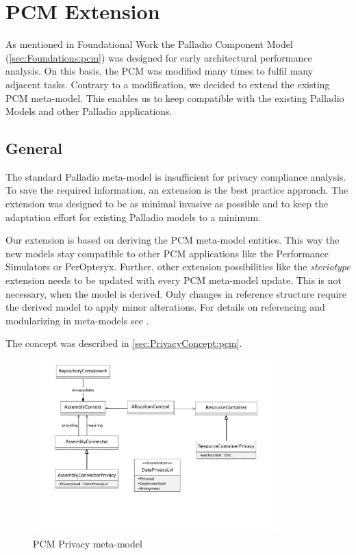 
\chapter{PCM Extension}
\label{ch:pcmExtension}

As mentioned in Foundational Work the Palladio Component Model (\autoref{sec:Foundations:pcm}) was designed for early architectural performance analysis. On this basis, the PCM was modified many times to fulfil many adjacent tasks. Contrary to a modification, we decided to extend the existing PCM meta-model. This enables us to keep compatible with the existing Palladio Models and other Palladio applications.

\section{General}
\label{sec:pcmExtension:general}

The standard Palladio meta-model is insufficient for privacy compliance analysis. To save the required information, an extension is the best practice approach. The extension was designed to be as minimal invasive as possible and to keep the adaptation effort for existing Palladio models to a minimum.

Our extension is based on deriving the PCM meta-model entities. This way the new models stay compatible to other PCM applications like the Performance Simulators or PerOpteryx. Further, other extension possibilities like the \textit{steriotype} extension needs to be updated with every PCM meta-model update. This is not necessary, when the model is derived. Only changes in reference structure require the derived model to apply minor alterations. For details on referencing and modularizing in meta-models see \cite{Strittmatter.2015}.

The concept was described in \autoref{sec:PrivacyConcept:pcm}.

\begin{figure}[h]
	\centering
	\includegraphics[trim = 20mm 50mm 20mm 05mm, clip, width=0.85\textwidth]{graphs/pcm_privacy_meta}
	\caption{PCM Privacy meta-model}
	\label{fig:pcmExtension:meta}
\end{figure}


